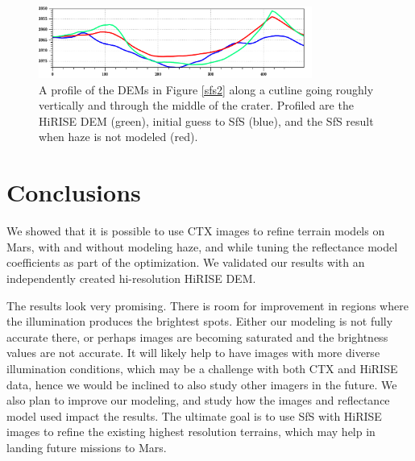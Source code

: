 \documentclass[draft,linenumbers]{agujournal}
\begin{document}
\begin{figure}[h!]
\centering
\includegraphics[width=0.8\textwidth]{profile.png}
\caption[sfs]{A profile of the DEMs in Figure \ref{sfs2} along a cutline going roughly vertically and through the middle of the crater. Profiled are the HiRISE DEM (green), initial guess to SfS (blue), and the SfS result when haze is not modeled (red).}
\label{profile}
\end{figure}


\section{Conclusions}

We showed that it is possible to use CTX images to refine terrain models on Mars, with and without modeling haze, and while tuning the reflectance model coefficients as part of the optimization. We validated our results with an independently created hi-resolution HiRISE DEM. 

The results look very promising. There is room for improvement in regions where the illumination produces the brightest spots. Either our modeling is not fully accurate there, or perhaps images are becoming saturated and the brightness values are not accurate. It will likely help to have images with more diverse illumination conditions, which may be a challenge with both CTX and HiRISE data, hence we would be inclined to also study other imagers in the future. We also plan to improve our modeling, and study how the images and reflectance model used impact the results. The ultimate goal is to use SfS with HiRISE images to refine the existing highest resolution terrains, which may help in landing future missions to Mars. 



\end{document}
